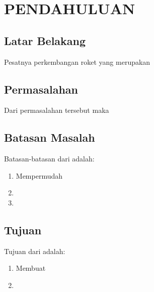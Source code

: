 \chapter{PENDAHULUAN}
\label{chap:pendahuluan}


\section{Latar Belakang}
\label{sec:latarbelakang}

Pesatnya perkembangan roket yang merupakan \lipsum[1]

\lipsum[2]

\section{Permasalahan}
\label{sec:permasalahan}

Dari permasalahan tersebut maka \lipsum[1][1-6]

\section{Batasan Masalah}
\label{sec:batasanmasalah}

Batasan-batasan dari \lipsum[1][1-3] adalah:

\begin{enumerate}[nolistsep]

  \item Mempermudah \lipsum[2][1-3]

  \item \lipsum[3][1-5]

  \item \lipsum[4][1-5]

\end{enumerate}

\section{Tujuan}
\label{sec:Tujuan}

Tujuan dari \lipsum[1][1-3] adalah:

\begin{enumerate}[nolistsep]

  \item Membuat \lipsum[2][1-3]

  \item \lipsum[3][1-3]

\end{enumerate}

